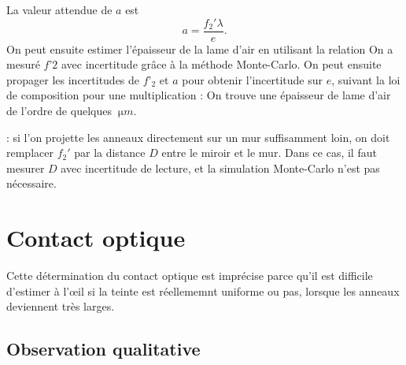 \begin{quest}
{

La valeur attendue de $a$ est
$$
a = \frac{f_2' \lambda}{e}.
$$
On peut ensuite estimer l'épaisseur de la lame d'air en utilisant la relation
On a mesuré $f’2$ avec incertitude grâce à la méthode Monte-Carlo. On peut ensuite propager les incertitudes de $f’_2$ et $a$ pour obtenir l’incertitude sur $e$, suivant la loi de composition pour une multiplication :
On trouve une épaisseur de lame d’air de l’ordre de quelques $\SI{}{\micro m}$.


 : si l'on projette les anneaux directement sur un mur suffisamment loin, on doit remplacer $f_2'$ par la distance $D$ entre le miroir et le mur. Dans ce cas, il faut mesurer $D$ avec incertitude de lecture, et la simulation Monte-Carlo n’est pas nécessaire.
}
\end{quest}



 \section{Contact optique}
 \begin{protocole}
 {
    Cette détermination du contact optique est imprécise parce qu'il est difficile d'estimer à l'œil si la teinte est réellememnt uniforme ou pas, lorsque les anneaux deviennent très larges.
 }
 \end{protocole}


\subsection{Observation qualitative} 

